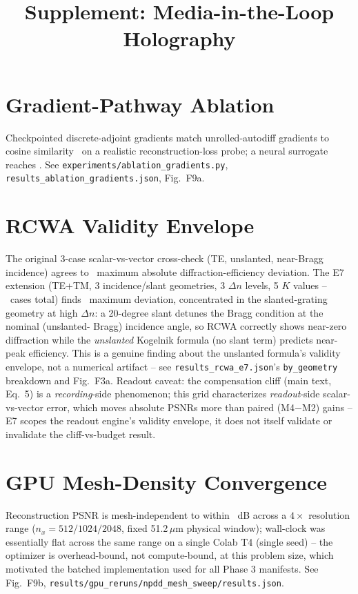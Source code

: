 \documentclass[10pt]{article}
\title{Supplement: Media-in-the-Loop Holography}
\date{}
\begin{document}
\maketitle

\section{Gradient-Pathway Ablation}
Checkpointed discrete-adjoint gradients match unrolled-autodiff gradients
to cosine similarity \AblationCheckpointCosSim\ on a realistic
reconstruction-loss probe; a neural surrogate reaches
\AblationSurrogateCosSim. See \texttt{experiments/ablation\_gradients.py},
\texttt{results\_ablation\_gradients.json}, Fig.~F9a.

\section{RCWA Validity Envelope}
The original 3-case scalar-vs-vector cross-check (TE, unslanted,
near-Bragg incidence) agrees to \RCWAMaxDevThreeCase\ maximum absolute
diffraction-efficiency deviation. The E7 extension (TE+TM, 3
incidence/slant geometries, 3 $\Delta n$ levels, 5 $K$ values --
\RCWAVGridNCases\ cases total) finds \RCWAVGridMaxDev\ maximum deviation,
concentrated in the slanted-grating geometry at high $\Delta n$: a
20-degree slant detunes the Bragg condition at the nominal (unslanted-
Bragg) incidence angle, so RCWA correctly shows near-zero diffraction
while the \emph{unslanted} Kogelnik formula (no slant term) predicts
near-peak efficiency. This is a genuine finding about the unslanted
formula's validity envelope, not a numerical artifact -- see
\texttt{results\_rcwa\_e7.json}'s \texttt{by\_geometry} breakdown and
Fig.~F3a. Readout caveat: the compensation cliff (main text, Eq.~5) is a
\emph{recording}-side phenomenon; this grid characterizes
\emph{readout}-side scalar-vs-vector error, which moves absolute PSNRs
more than paired (M4$-$M2) gains -- E7 scopes the readout engine's
validity envelope, it does not itself validate or invalidate the
cliff-vs-budget result.

\section{GPU Mesh-Density Convergence}
Reconstruction PSNR is mesh-independent to within \MeshPSNRSpread~dB
across a $4\times$ resolution range ($n_x=512/1024/2048$, fixed 51.2\,$\mu$m
physical window); wall-clock was essentially flat across the same range on
a single Colab T4 (single seed) -- the optimizer is overhead-bound, not
compute-bound, at this problem size, which motivated the batched
implementation used for all Phase 3 manifests. See Fig.~F9b,
\texttt{results/gpu\_reruns/npdd\_mesh\_sweep/results.json}.
\end{document}

